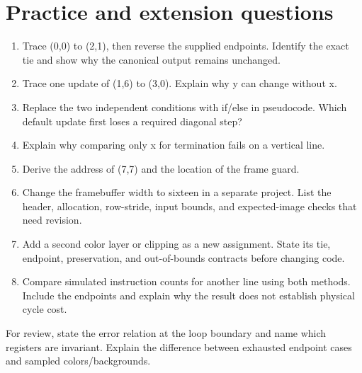 \section{Practice and extension
  questions}\label{007-bresenham-line-x-practice-practice-and-extension-questions}

\begin{enumerate}
  \def\labelenumi{\arabic{enumi}.}
  \tightlist
  \item
        Trace (0,0) to (2,1), then reverse the supplied endpoints. Identify
        the exact tie and show why the canonical output remains unchanged.
  \item
        Trace one update of (1,6) to (3,0). Explain why y can change without
        x.
  \item
        Replace the two independent conditions with if/else in pseudocode.
        Which default update first loses a required diagonal step?
  \item
        Explain why comparing only x for termination fails on a vertical line.
  \item
        Derive the address of (7,7) and the location of the frame guard.
  \item
        Change the framebuffer width to sixteen in a separate project. List
        the header, allocation, row-stride, input bounds, and expected-image
        checks that need revision.
  \item
        Add a second color layer or clipping as a new assignment. State its
        tie, endpoint, preservation, and out-of-bounds contracts before
        changing code.
  \item
        Compare simulated instruction counts for another line using both
        methods. Include the endpoints and explain why the result does not
        establish physical cycle cost.
\end{enumerate}

For review, state the error relation at the loop boundary and name which
registers are invariant. Explain the difference between exhausted
endpoint cases and sampled colors/backgrounds.
